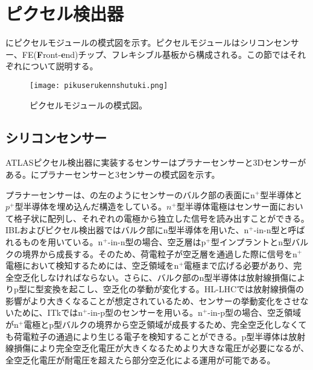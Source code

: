 \section{ピクセル検出器}
\label{sec:pixelkenshutuki}

にピクセルモジュールの模式図を示す。ピクセルモジュールはシリコンセンサー、FE(\textbf{F}ront-\textbf{e}nd)チップ、フレキシブル基板から構成される。この節ではそれぞれについて説明する。

\begin{figure}[tbp]
  \centering
  \texttt{[image: pikuserukennshutuki.png]}
  \caption[ピクセルモジュールの模式図]{ピクセルモジュールの模式図。}
  \label{fig:pikuserukennshutuki}
\end{figure}

\subsection{シリコンセンサー}
\label{sec:silicon}
ATLASピクセル検出器に実装するセンサーはプラナーセンサーと3Dセンサーがある。にプラナーセンサーと3センサーの模式図を示す。

プラナーセンサーは、の左のようにセンサーのバルク部の表面にn$^+$型半導体と$p^+$型半導体を埋め込んだ構造をしている。$n^+$型半導体電極はセンサー面において格子状に配列し、それぞれの電極から独立した信号を読み出すことができる。IBLおよびピクセル検出器ではバルク部にn型半導体を用いた、n$^{+}$-in-n型と呼ばれるものを用いている。n$^{+}$-in-n型の場合、空乏層はp$^{+}$型インプラントとn型バルクの境界から成長する。そのため、荷電粒子が空乏層を通過した際に信号をn$^{+}$電極において検知するためには、空乏領域をn$^{+}$電極まで広げる必要があり、完全空乏化しなければならない。さらに、バルク部のn型半導体は放射線損傷によりp型に型変換を起こし、空乏化の挙動が変化する。HL-LHCでは放射線損傷の影響がより大きくなることが想定されているため、センサーの挙動変化をさせないために、ITkではn$^{+}$-in-p型のセンサーを用いる。n$^{+}$-in-p型の場合、空乏領域がn$^{+}$電極とp型バルクの境界から空乏領域が成長するため、完全空乏化しなくても荷電粒子の通過により生じる電子を検知することができる。p型半導体は放射線損傷により完全空乏化電圧が大きくなるためより大きな電圧が必要になるが、全空乏化電圧が耐電圧を超えたら部分空乏化による運用が可能である。


